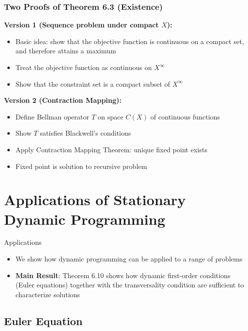 \documentclass[9pt,aspectratio=169]{beamer}
\begin{document}
\begin{frame}
\frametitle{Two Proofs of Theorem 6.3 (Existence)}

\textbf{Version 1 (Sequence problem under compact $X$):}
\begin{itemize}
    \item Basic idea: show that the objective function is continuous on a
    compact set, and therefore attains a maximum
    \item Treat the objective function as continuous on $X^\infty$
    \item Show that the constraint set is a compact subset of $X^\infty$
\end{itemize}


\textbf{Version 2 (Contraction Mapping):}
\begin{itemize}
    \item Define Bellman operator $T$ on space $C(X)$ of continuous functions
    \item Show $T$ satisfies Blackwell's conditions
    \item Apply Contraction Mapping Theorem: unique fixed point exists
    \item Fixed point is solution to recursive problem
\end{itemize}

\end{frame}

\section{Applications of Stationary Dynamic Programming}

\begin{frame}{Applications}
    \begin{itemize}
        \item We show how dynamic programming can be applied to a range of
        problems
        \item \textbf{Main Result}: Theorem 6.10 shows how dynamic
        first-order conditions (Euler equations) together with the
        transversality condition are sufficient to characterize solutions
    \end{itemize}
\end{frame}

\subsection{Euler Equation}
\end{document}
